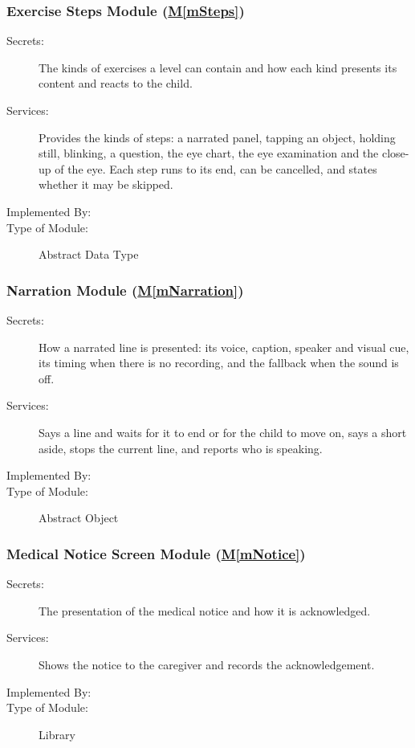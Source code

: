 \documentclass[12pt, titlepage]{article}
\newcommand{\mref}[1]{\hyperref[#1]{M\ref*{#1}}}
\begin{document}
\subsubsection{Exercise Steps Module (\mref{mSteps})}

\begin{description}
\item[Secrets:] The kinds of exercises a level can contain and how each kind
  presents its content and reacts to the child.
\item[Services:] Provides the kinds of steps: a narrated panel, tapping an
  object, holding still, blinking, a question, the eye chart, the eye
  examination and the close-up of the eye. Each step runs to its end, can be
  cancelled, and states whether it may be skipped.
\item[Implemented By:] \progname{}
\item[Type of Module:] Abstract Data Type
\end{description}

\subsubsection{Narration Module (\mref{mNarration})}

\begin{description}
\item[Secrets:] How a narrated line is presented: its voice, caption, speaker
  and visual cue, its timing when there is no recording, and the fallback when
  the sound is off.
\item[Services:] Says a line and waits for it to end or for the child to move
  on, says a short aside, stops the current line, and reports who is speaking.
\item[Implemented By:] \progname{}
\item[Type of Module:] Abstract Object
\end{description}

\subsubsection{Medical Notice Screen Module (\mref{mNotice})}

\begin{description}
\item[Secrets:] The presentation of the medical notice and how it is
  acknowledged.
\item[Services:] Shows the notice to the caregiver and records the
  acknowledgement.
\item[Implemented By:] \progname{}
\item[Type of Module:] Library
\end{description}
\end{document}
